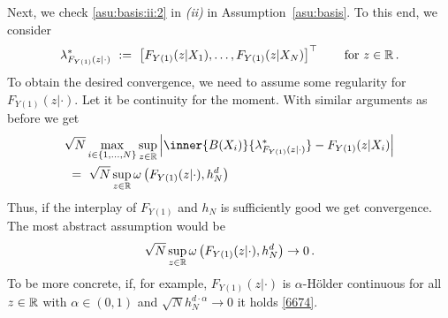 \begin{example}
Next, we check \eqref{asu:basis:ii:2} in \textit{(ii)} in Assumption~\ref{asu:basis}.
To this end, we consider
\begin{gather*}
  \lambda^*_{F_{Y(1)}(z|\cdot)}
  \ 
  :=
  \ 
  \left[ 
    F_{Y(1)}(z|X_1)
    ,
    \ldots
    ,
    F_{Y(1)}(z|X_N)
  \right]
  ^\top
  \qquad
  \text{for}\ 
  z\in\R
  \,.
\end{gather*}
To obtain the desired convergence, we need to assume some regularity for 
$
    F_{Y(1)}(z|\cdot)
$.
Let it be continuity for the moment.
With similar arguments as before we get
    \begin{align*}
      &
         \sqrt{N}
        \max_{i\in \left\{ 1,\ldots,N \right\}}
        \sup_{z\in\R}
        \left| 
        \inner{B(X_i)}
        {
      \lambda^*_{F_{Y(1)}(z|\cdot)}
      }
        -
        F_{Y(1)}(z|X_i)
        \right|
        \\
        &
        \ 
        =
        \ 
         \sqrt{N}
        \sup_{z\in\R}
        \omega
        \left( 
        F_{Y(1)}(z|\cdot)
        ,
        h_N^d
        \right)
    \end{align*}
    Thus, if the interplay of $F_{Y(1)}$ and $h_N$ is sufficiently good we get convergence.
    The most abstract assumption would be
    \begin{gather}
      \label{6674}
         \sqrt{N}
        \sup_{z\in\mathbb{R}}
        \omega
        \left( 
        F_{Y(1)}(z|\cdot)
        ,
        h_N^d
        \right)
        \to
        0
        \,.
    \end{gather}
    To be more concrete, if, for example,
$
    F_{Y(1)}(z|\cdot)
    $
    is $\alpha$-Hölder continuous for all $z\in\mathbb{R}$ with 
    $\alpha\in(0,1)$ and $\sqrt{N}h_N^{d\cdot \alpha}\to 0$ it holds
    \eqref{6674}.

\end{example}

